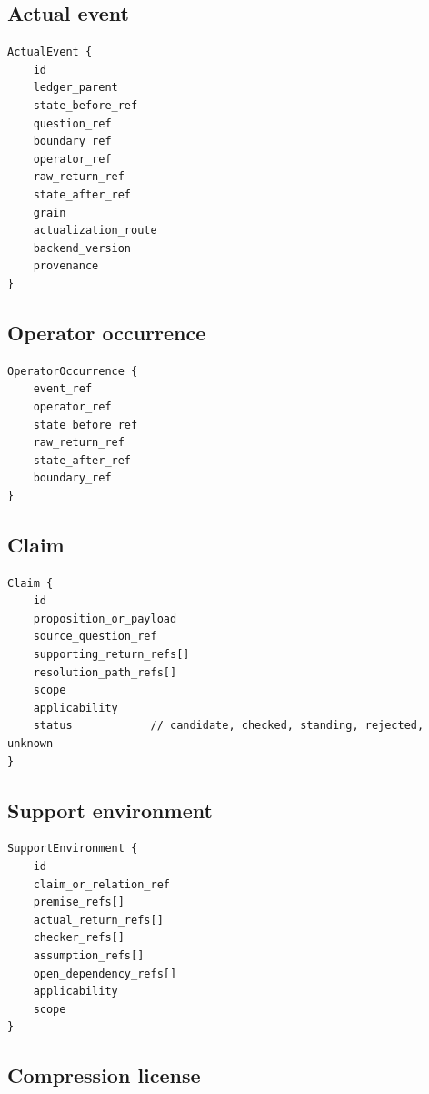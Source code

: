 \documentclass[11pt,oneside]{article}
\begin{document}
\subsection{Actual event}

\begin{lstlisting}[basicstyle=\ttfamily\small]
ActualEvent {
    id
    ledger_parent
    state_before_ref
    question_ref
    boundary_ref
    operator_ref
    raw_return_ref
    state_after_ref
    grain
    actualization_route
    backend_version
    provenance
}
\end{lstlisting}

\subsection{Operator occurrence}

\begin{lstlisting}[basicstyle=\ttfamily\small]
OperatorOccurrence {
    event_ref
    operator_ref
    state_before_ref
    raw_return_ref
    state_after_ref
    boundary_ref
}
\end{lstlisting}

\subsection{Claim}

\begin{lstlisting}[basicstyle=\ttfamily\small]
Claim {
    id
    proposition_or_payload
    source_question_ref
    supporting_return_refs[]
    resolution_path_refs[]
    scope
    applicability
    status            // candidate, checked, standing, rejected, unknown
}
\end{lstlisting}

\subsection{Support environment}

\begin{lstlisting}[basicstyle=\ttfamily\small]
SupportEnvironment {
    id
    claim_or_relation_ref
    premise_refs[]
    actual_return_refs[]
    checker_refs[]
    assumption_refs[]
    open_dependency_refs[]
    applicability
    scope
}
\end{lstlisting}

\subsection{Compression license}
\end{document}
